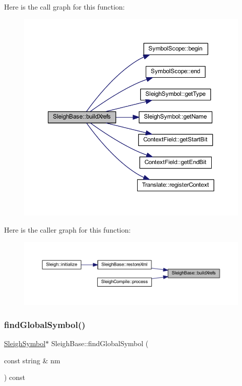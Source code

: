 Here is the call graph for this function\+:
\nopagebreak
\begin{figure}[H]
\begin{center}
\leavevmode
\includegraphics[width=350pt]{class_sleigh_base_a25a5389699beb6eeb71db527808cddf7_cgraph}
\end{center}
\end{figure}
Here is the caller graph for this function\+:
\nopagebreak
\begin{figure}[H]
\begin{center}
\leavevmode
\includegraphics[width=350pt]{class_sleigh_base_a25a5389699beb6eeb71db527808cddf7_icgraph}
\end{center}
\end{figure}
\mbox{\label{class_sleigh_base_aa0df65ed7937d35defce5296a55e5fe5}} 
\subsubsection{\texorpdfstring{findGlobalSymbol()}{findGlobalSymbol()}}
{\footnotesize\ttfamily \mbox{\hyperlink{class_sleigh_symbol}{Sleigh\+Symbol}}$\ast$ Sleigh\+Base\+::find\+Global\+Symbol (\begin{DoxyParamCaption}\item[{const string \&}]{nm }\end{DoxyParamCaption}) const\hspace{0.3cm}{\ttfamily [inline]}}



